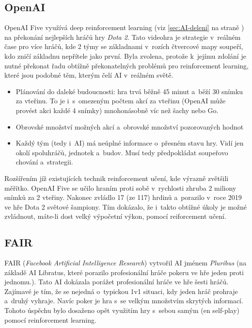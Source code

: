\documentclass[12pt,oneside]{report}			%
\newcommand{\doubleref}[1]{\ref{#1} na straně \pageref{#1}}
\begin{document}
	\subsection{OpenAI}
	\label{sec:OpenAI}
	OpenAI Five využívá deep reinforcement learning (\gls{viz} \doubleref{sec:AI-deleni}) na překonání nejlepších hráčů hry \emph{Dota 2}. Tato videohra je strategie v~reálném čase pro více hráčů, kde 2 týmy se základnami v~rozích čtvercové mapy soupeří, kdo zničí základnu nepřítele jako první. Byla zvolena, protože k~jejímu zdolání je nutné překonat řadu obtížně překonatelných problémů pro reinforcement learning, které jsou podobné těm, kterým čelí \gls{AI} v~reálném světě.
	\begin{itemize}
	\item Plánování do daleké budoucnosti: hra trvá běžně 45 minut a~běží 30 snímku za vteřinu. To je i~s~omezeným počtem akcí za vteřinu (OpenAI může provést akci každé 4 snímky) mnohonásobně víc než šachy nebo Go.
	\item Obrovské množství možných akcí a~obrovské množství pozorovaných hodnot
	\item Každý tým (tedy i~\gls{AI}) má neúplné informace o~přesném stavu hry. Vidí jen okolí spoluhráčů, jednotek a~budov. Musí tedy předpokládat soupeřovo chování a~strategii.
	\end{itemize}
	Rozšířením jíž existujících technik reinforcement učení, kde výrazně zvětšili měřítko. OpenAI Five se učilo hraním proti sobě v~rychlosti  zhruba 2 miliony snímků za 2 vteřiny. Nakonec zvládlo 17 (ze 117) hrdinů a~porazilo v~roce 2019 ve hře  Dota 2 světové šampiony. Tím dokázalo, že i~takto obtížné úkoly je možné zvládnout, máte-li dost velký výpočetní výkon, pomocí reiforcement učení. \parencite{openai2019dota}
\subsection{FAIR}
	\label{sec:FAIR}
	FAIR (\emph{Facebook Artificial Intelligence Research}) vytvořil \gls{AI} jménem \emph{Pluribus} (na základě \gls{AI} Libratus, které porazilo profesionální hráče pokeru ve hře jeden proti jednomu.). Tato \gls{AI} dokázala porážet profesionální hráče ve hře šesti hráčů. Zajímavé je tím, že se nejedná o~typickou 1v1 situaci, kdy jeden hráč prohraje a~druhý vyhraje. Navíc poker je hra s~se velkým množstvím skrytých informací. Tohoto úspěchu bylo dosaženo opět využitím hry s~sebou samým (\gls{en} self-play) pomocí reinforcement learning. \parencite{FAIR-poker}
		
	
\end{document}
